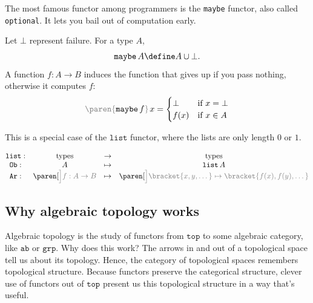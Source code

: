 \documentclass[a5paper]{scrartcl}
\def\topcat{\texttt{top}}
\def\grp{\texttt{grp}}
\def\ab{\texttt{ab}}
\newcommand{\obj}{\texttt{Ob}}
\newcommand{\arr}{\texttt{Ar}}
\newcommand{\gray}[1]{{\color{gray}#1}}
\newcommand{\black}[1]{{\color{black}#1}}
\newcommand{\gparen}[1]{\left .\!{\gray{\paren{\black{#1}}}}\!\right.}
\begin{document}
The most famous functor among programmers is the \texttt{maybe} functor, also called \texttt{optional}. It lets you bail out of computation early.
\begin{defn}
  Let \(\bot\) represent failure. For a type \(A\), \[\texttt{maybe}\,A \define A \cup \bot.\] A function \(f:A \to B\) induces the function that gives up if you pass nothing, otherwise it computes \(f\):
  \[
    \gparen{\texttt{maybe}\, f} x=
    \begin{cases}
      \bot &\text{if } x= \bot \\
      f(x) &\text{if } x\in A
    \end{cases}
  \]
\end{defn}
This is a special case of the \(\texttt{list}\) functor, where the lists are only length \(0\) or \(1\).
\begin{defn}
  \[
    \begin{matrix}
      \texttt{list} :&\text{types} &\to& \text{types} \\
      \obj: &  A &\mapsto & \texttt{list}\, A \\
      \arr:& \paren[\color{gray}\Big]{f:A \to B} &\mapsto & \paren[\color{gray}\Big]{\bracket{x,y,\dots} \mapsto \bracket{f(x), f(y),\dots}}
    \end{matrix}
  \]
\end{defn}

\subsection{Why algebraic topology works}
Algebraic topology is the study of functors from \(\topcat\) to some algebraic category, like \(\ab\) or \(\grp\). Why does this work? The arrows in and out of a topological space tell us about its topology. Hence, the category of topological spaces remembers topological structure. Because functors preserve the categorical structure, clever use of functors out of \(\topcat\) present us this topological structure in a way that's useful.
\end{document}

